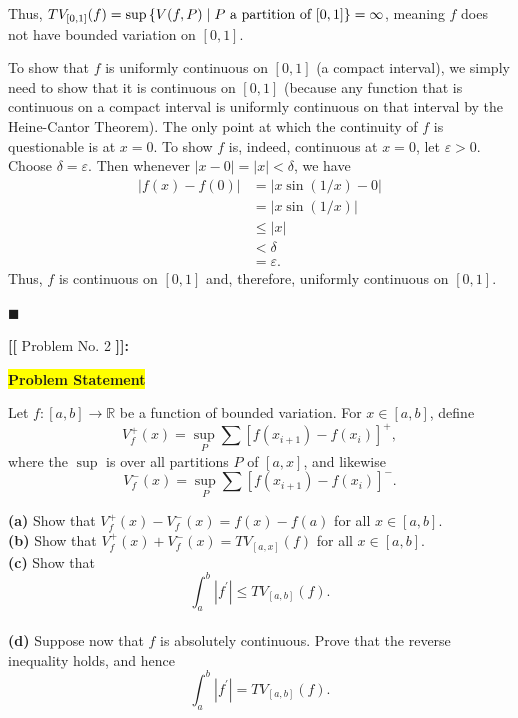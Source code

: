 \documentclass[12pt]{article}
\newcommand{\mybox}{%
    \collectbox{%
        \setlength{\fboxsep}{2pt}%
        \fbox{\BOXCONTENT}%
    }%
}
\begin{document}
\vspace{-3mm}

\noindent Thus, $TV_{[0,1]}(f) = \sup\left\lbrace V(f,P) \hspace{1mm}|\hspace{1mm} P \text{ a partition of } [0,1] \right\rbrace = \infty$, meaning $f$ does not have bounded variation on $[0,1]$.

To show that $f$ is uniformly continuous on $[0,1]$ (a compact interval), we simply need to show that it is continuous on $[0,1]$ (because any function that is continuous on a compact interval is uniformly continuous on that interval by the Heine-Cantor Theorem). The only point at which the continuity of $f$ is questionable is at $x=0$. To show $f$ is, indeed, continuous at $x=0$, let $\varepsilon > 0$. Choose $\delta = \varepsilon$. Then whenever $|x-0|=|x|<\delta$, we have 
\begin{align}
    |f(x)-f(0)| &= \left|x\sin\left(1/x\right) - 0\right| \\
    &= \left|x\sin\left(1/x\right)\right| \\
    &\leq |x| \\
    &<\delta \\
    &=\varepsilon.
\end{align}
Thus, $f$ is continuous on $[0,1]$ and, therefore, uniformly continuous on $[0,1].$

\hfill$\blacksquare$

\pagebreak

\noindent \textbf{{\huge [}{\Large [}} Problem No. 2 \textbf{{\Large ]}{\huge ]}}{\Large \textbf{:}}

\vspace{3mm}

\noindent\mybox{\colorbox{yellow}{\textbf{Problem Statement}}}\hspace{3mm}\hrulefill 

\noindent Let $f: [a,b] \longrightarrow \mathbb{R}$ be a function of bounded variation. For $x\in[a,b]$, define
$$V_f^+(x) = \sup\limits_{P}\sum\left[f(x_{i+1}) - f(x_i)\right]^+,$$ where the $\sup$ is over all partitions $P$ of $[a,x]$, and likewise 
$$V_f^-(x) = \sup\limits_P\sum\left[f(x_{i+1})-f(x_i)\right]^-.$$

\noindent\textbf{(a)} Show that $V_f^+(x) - V_f^-(x) = f(x) - f(a)$ for all $x\in[a,b].$
\\
\noindent\textbf{(b)} Show that $V_f^+(x) + V_f^-(x) = TV_{[a,x]}(f)$ for all $x\in[a,b].$
\\
\noindent\textbf{(c)} Show that $$\int_a^b|f^{\prime}|\leq TV_{[a,b]}(f).$$
\\
\noindent\textbf{(d)} Suppose now that $f$ is absolutely continuous. Prove that the reverse inequality holds, and hence $$\int_a^b |f^{\prime}| = TV_{[a,b]}(f).$$
\end{document}
